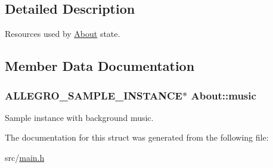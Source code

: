 \subsection{\-Detailed \-Description}
\-Resources used by \hyperlink{structAbout}{\-About} state. 

\subsection{\-Member \-Data \-Documentation}
\hypertarget{structAbout_a4c25f6cd85f909dca5325b8825eed16c}{
\subsubsection[{music}]{\setlength{\rightskip}{0pt plus 5cm}\-A\-L\-L\-E\-G\-R\-O\-\_\-\-S\-A\-M\-P\-L\-E\-\_\-\-I\-N\-S\-T\-A\-N\-C\-E$\ast$ {\bf \-About\-::music}}}\label{structAbout_a4c25f6cd85f909dca5325b8825eed16c}
\-Sample instance with background music. 

\-The documentation for this struct was generated from the following file\-:\begin{DoxyCompactItemize}
\item 
src/\hyperlink{main_8h}{main.\-h}\end{DoxyCompactItemize}
